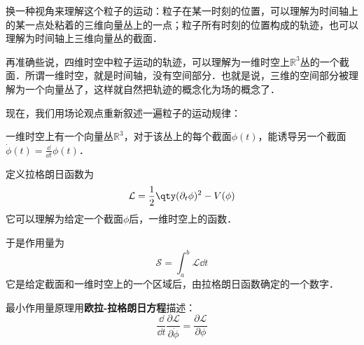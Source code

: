 换一种视角来理解这个粒子的运动：粒子在某一时刻的位置，可以理解为时间轴上的某一点处粘着的三维向量丛上的一点；粒子所有时刻的位置构成的轨迹，也可以理解为时间轴上三维向量丛的截面．

再准确些说，四维时空中粒子运动的轨迹，可以理解为一维时空上$\mathbb{R}^3$丛的一个截面．所谓一维时空，就是时间轴，没有空间部分．也就是说，三维的空间部分被理解为一个向量丛了，这样就自然把轨迹的概念化为场的概念了．

现在，我们用场论观点重新叙述一遍粒子的运动规律：

一维时空上有一个向量丛$\mathbb{R}^3$，对于该丛上的每个截面$\phi(t)$，能诱导另一个截面$\dot{\phi}(t)=\frac{\dd}{\dd t}\phi(t)$．

定义拉格朗日函数为
\begin{equation}
\mathcal{L} = \frac{1}{2}\qty(\partial_t \phi)^2 - V(\phi)
\end{equation}
它可以理解为给定一个截面$\phi$后，一维时空上的函数．

于是作用量为
\begin{equation}
\mathcal{S}=\int_a^b \mathcal{L}\dd t
\end{equation}
它是给定截面和一维时空上的一个区域后，由拉格朗日函数确定的一个数字．

最小作用量原理用\textbf{欧拉-拉格朗日方程}描述：
\begin{equation}
\frac{\dd}{\dd t}\frac{\partial\mathcal{L}}{\partial\dot{\phi}} = \frac{\partial \mathcal{L}}{\partial\phi}
\end{equation}


















